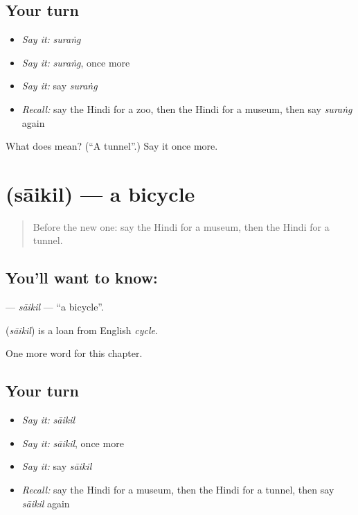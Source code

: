 \subsection*{Your turn}
\begin{itemize}
\raggedright
  \item \emph{Say it:} \emph{suraṅg}
  \item \emph{Say it:} \emph{suraṅg}, once more
  \item \emph{Say it:} say \emph{suraṅg}
  \item \emph{Recall:} say the Hindi for a zoo, then the Hindi for a museum, then say \emph{suraṅg} again
\end{itemize}

\begin{tcolorbox}[breakable,colback=teal!4,colframe=teal!35!black,title={Before you move on}]
What does  mean? (\textquotedblleft{}A tunnel\textquotedblright{}.) Say it once more.
\end{tcolorbox}
\section[\texorpdfstring{\hi{साइकिल} (sāikil)}{साइकिल (sāikil)}]{ (sāikil) — a bicycle}

\label{lesson:HI-C203-saikil}



\begin{quote}
Before the new one: say the Hindi for a museum, then the Hindi for a tunnel.
\end{quote}

\subsection*{You'll want to know: }
\textbf{} — \emph{sāikil} — \textquotedblleft{}a bicycle\textquotedblright{}.

\begin{cousinweb}
\textbf{} (\emph{sāikil}) is a loan from English \emph{cycle}.
\end{cousinweb}

\begin{grammarlens}[title={What you've built}]
One more word for this chapter.
\end{grammarlens}

\subsection*{Your turn}
\begin{itemize}
\raggedright
  \item \emph{Say it:} \emph{sāikil}
  \item \emph{Say it:} \emph{sāikil}, once more
  \item \emph{Say it:} say \emph{sāikil}
  \item \emph{Recall:} say the Hindi for a museum, then the Hindi for a tunnel, then say \emph{sāikil} again
\end{itemize}

